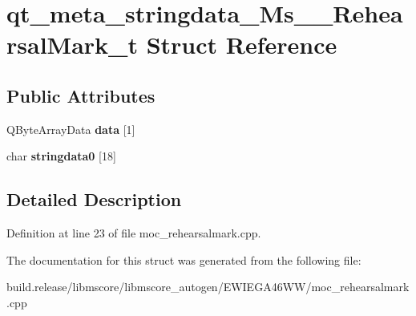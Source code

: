 \hypertarget{structqt__meta__stringdata___ms_____rehearsal_mark__t}{}\section{qt\+\_\+meta\+\_\+stringdata\+\_\+\+Ms\+\_\+\+\_\+\+Rehearsal\+Mark\+\_\+t Struct Reference}
\label{structqt__meta__stringdata___ms_____rehearsal_mark__t}
\subsection*{Public Attributes}
\begin{DoxyCompactItemize}
\item 
\mbox{\label{structqt__meta__stringdata___ms_____rehearsal_mark__t_a2dba50e85e281539982d79e2df2ed5ee}} 
Q\+Byte\+Array\+Data {\bfseries data} \mbox{[}1\mbox{]}
\item 
\mbox{\label{structqt__meta__stringdata___ms_____rehearsal_mark__t_a3d19a52dea8477358404656de64acb41}} 
char {\bfseries stringdata0} \mbox{[}18\mbox{]}
\end{DoxyCompactItemize}


\subsection{Detailed Description}


Definition at line 23 of file moc\+\_\+rehearsalmark.\+cpp.



The documentation for this struct was generated from the following file\+:\begin{DoxyCompactItemize}
\item 
build.\+release/libmscore/libmscore\+\_\+autogen/\+E\+W\+I\+E\+G\+A46\+W\+W/moc\+\_\+rehearsalmark.\+cpp\end{DoxyCompactItemize}
